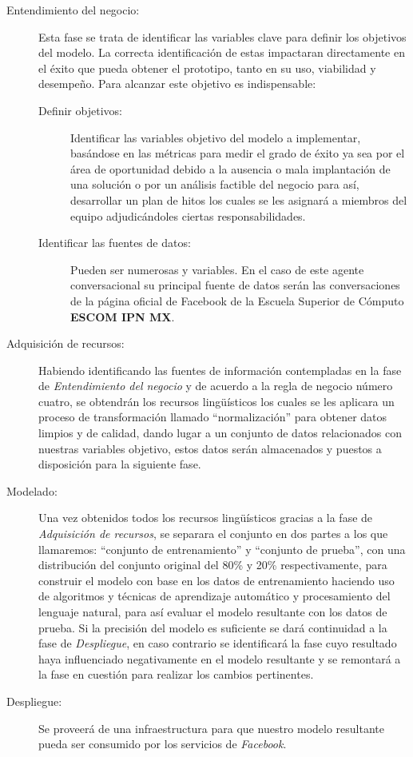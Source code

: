         \begin{description}
            \item[Entendimiento del negocio:] Esta fase se trata de identificar las variables clave para definir los objetivos del modelo. La correcta identificación de estas impactaran directamente en el éxito que pueda obtener el prototipo, tanto en su uso, viabilidad y desempeño. Para alcanzar este objetivo es indispensable:
                \begin{description}
                    \item [Definir objetivos:] Identificar las variables objetivo del modelo a implementar, basándose en las métricas para medir el grado de éxito ya sea por el área de oportunidad debido a la ausencia o mala implantación de una solución o por un análisis factible del negocio para así, desarrollar un plan de hitos los cuales se les asignará a miembros del equipo adjudicándoles ciertas responsabilidades.
                    \item [Identificar las fuentes de datos:] Pueden ser numerosas y variables. En el caso de este agente conversacional su principal fuente de datos serán las conversaciones de la página oficial de Facebook de la Escuela Superior de Cómputo {\bf ESCOM IPN MX}.
                \end{description}
            \item[Adquisición de recursos:] Habiendo identificando las fuentes de información contempladas en la fase de \textit{Entendimiento del negocio} y de acuerdo a la regla de negocio número cuatro, se obtendrán los recursos lingüísticos los cuales se les aplicara un proceso de transformación llamado ``normalización'' para obtener datos limpios y de calidad, dando lugar a un conjunto de datos relacionados con nuestras variables objetivo, estos datos serán almacenados y puestos a disposición para la siguiente fase.

            \item[Modelado:]
               Una vez obtenidos todos los recursos lingüísticos gracias a la fase de \textit{Adquisición de recursos}, se separara el conjunto en dos partes a los que llamaremos: ``conjunto de entrenamiento'' y ``conjunto de prueba'', con una distribución del conjunto original del 80\% y 20\% respectivamente, para construir el modelo con base en los datos de entrenamiento haciendo uso de algoritmos y técnicas de aprendizaje automático y procesamiento del lenguaje natural, para así evaluar el modelo resultante con los datos de prueba. 
               Si la precisión del modelo es suficiente se dará continuidad a la fase de \textit{Despliegue}, en caso contrario se identificará la fase cuyo resultado haya influenciado negativamente en el modelo resultante y se remontará a la fase en cuestión para realizar los cambios pertinentes.

            \item[Despliegue:]
                Se proveerá de una infraestructura para que nuestro modelo resultante pueda ser consumido por los servicios de \textit{Facebook}.
    
                
        \end{description}
        
